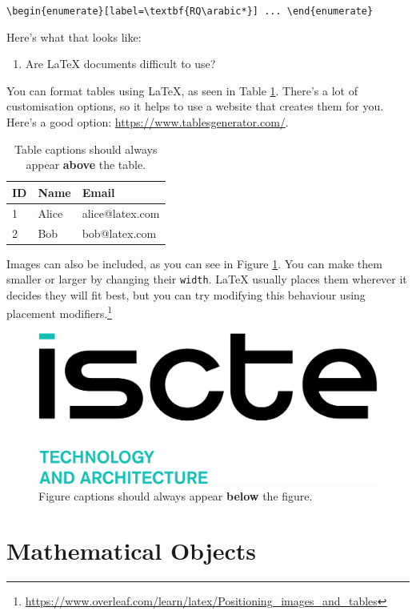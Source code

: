 \documentclass[12pt,reqno,twoside]{amsbook}
\begin{document}
\begin{center}
    \verb|\begin{enumerate}[label=\textbf{RQ\arabic*}] ... \end{enumerate}|
\end{center}

\noindent Here's what that looks like:

\begin{enumerate}[label=\textbf{RQ\arabic*}] 
    \item Are LaTeX documents difficult to use?
\end{enumerate}

\noindent You can format tables using LaTeX, as seen in Table \ref{table:example}. There's a lot of customisation options, so it helps to use a website that creates them for you. Here's a good option: \url{https://www.tablesgenerator.com/}.

\begin{table}[h]
\caption{Table captions should always appear \textbf{above} the table.}
\begin{tabular}{l|l|l}
ID & Name  & Email           \\ \hline
1  & Alice & alice@latex.com \\
2  & Bob   & bob@latex.com  
\end{tabular}
\label{table:example}
\end{table}

Images can also be included, as you can see in Figure \ref{fig:example}. You can make them smaller or larger by changing their \texttt{width}. LaTeX usually places them wherever it decides they will fit best, but you can try modifying this behaviour using placement modifiers.\footnote{\url{https://www.overleaf.com/learn/latex/Positioning_images_and_tables}}

\begin{figure}
    \centering
    \includegraphics[width=0.3\linewidth]{images/ista.png}
    \caption{Figure captions should always appear \textbf{below} the figure.}
    \label{fig:example}
\end{figure}

\section{Mathematical Objects}
\end{document}
